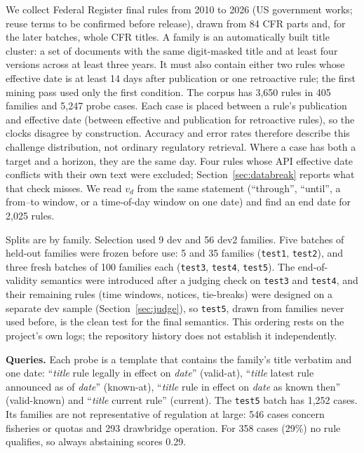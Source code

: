 \documentclass[11pt]{article}
\begin{document}
We collect Federal Register final rules from 2010 to 2026 (US government works; reuse terms to be confirmed before release), drawn from 84 CFR parts and, for the later batches, whole CFR titles. A family is an automatically built title cluster: a set of documents with the same digit-masked title and at least four versions across at least three years. It must also contain either two rules whose effective date is at least 14 days after publication or one retroactive rule; the first mining pass used only the first condition. The corpus has 3{,}650 rules in 405 families and 5{,}247 probe cases. Each case is placed between a rule's publication and effective date (between effective and publication for retroactive rules), so the clocks disagree by construction. Accuracy and error rates therefore describe this challenge distribution, not ordinary regulatory retrieval. Where a case has both a target and a horizon, they are the same day. Four rules whose API effective date conflicts with their own text were excluded; Section~\ref{sec:databreak} reports what that check misses. We read $v_d$ from the same statement (``through'', ``until'', a from--to window, or a time-of-day window on one date) and find an end date for 2{,}025 rules.

Splits are by family. Selection used 9 dev and 56 dev2 families. Five batches of held-out families were frozen before use: 5 and 35 families (\texttt{test1}, \texttt{test2}), and three fresh batches of 100 families each (\texttt{test3}, \texttt{test4}, \texttt{test5}). The end-of-validity semantics were introduced after a judging check on \texttt{test3} and \texttt{test4}, and their remaining rules (time windows, notices, tie-breaks) were designed on a separate dev sample (Section~\ref{sec:judge}), so \texttt{test5}, drawn from families never used before, is the clean test for the final semantics. This ordering rests on the project's own logs; the repository history does not establish it independently.

\textbf{Queries.} Each probe is a template that contains the family's title verbatim and one date: ``\textit{title} rule legally in effect on \textit{date}'' (valid-at), ``\textit{title} latest rule announced as of \textit{date}'' (known-at), ``\textit{title} rule in effect on \textit{date} as known then'' (valid-known) and ``\textit{title} current rule'' (current). The \texttt{test5} batch has 1{,}252 cases. Its families are not representative of regulation at large: 546 cases concern fisheries or quotas and 293 drawbridge operation. For 358 cases (29\%) no rule qualifies, so always abstaining scores 0.29.
\end{document}
